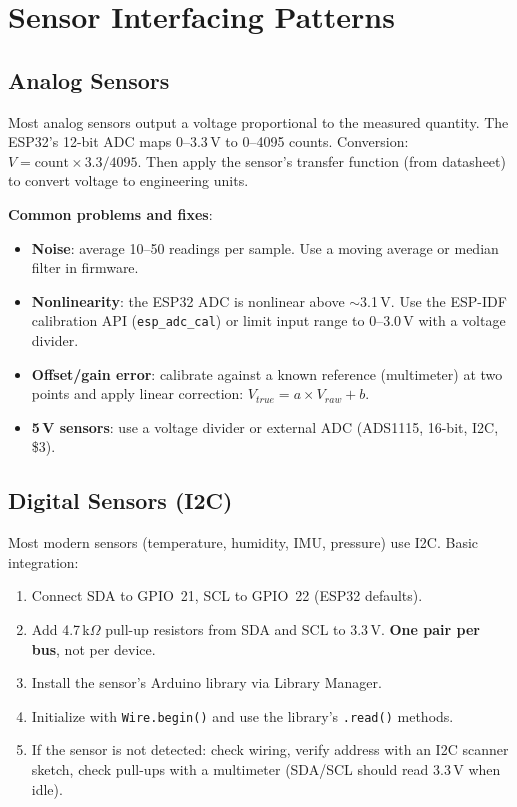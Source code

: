 \documentclass[11pt,letterpaper,twoside,openany]{book}
\begin{document}
\section{Sensor Interfacing Patterns}

\subsection{Analog Sensors}
Most analog sensors output a voltage proportional to the measured quantity. The ESP32's 12-bit ADC maps 0--3.3\,V to 0--4095 counts. Conversion: $V = \text{count} \times 3.3 / 4095$. Then apply the sensor's transfer function (from datasheet) to convert voltage to engineering units.

\textbf{Common problems and fixes}:
\begin{itemize}[nosep,leftmargin=1.5em]
\item \textbf{Noise}: average 10--50 readings per sample. Use a moving average or median filter in firmware.
\item \textbf{Nonlinearity}: the ESP32 ADC is nonlinear above $\sim$3.1\,V. Use the ESP-IDF calibration API (\texttt{esp\_adc\_cal}) or limit input range to 0--3.0\,V with a voltage divider.
\item \textbf{Offset/gain error}: calibrate against a known reference (multimeter) at two points and apply linear correction: $V_{true} = a \times V_{raw} + b$.
\item \textbf{5\,V sensors}: use a voltage divider or external ADC (ADS1115, 16-bit, I2C, \$3).
\end{itemize}

\subsection{Digital Sensors (I2C)}
Most modern sensors (temperature, humidity, IMU, pressure) use I2C. Basic integration:
\begin{enumerate}[nosep,leftmargin=1.5em]
\item Connect SDA to GPIO~21, SCL to GPIO~22 (ESP32 defaults).
\item Add 4.7\,k$\Omega$ pull-up resistors from SDA and SCL to 3.3\,V. \textbf{One pair per bus}, not per device.
\item Install the sensor's Arduino library via Library Manager.
\item Initialize with \texttt{Wire.begin()} and use the library's \texttt{.read()} methods.
\item If the sensor is not detected: check wiring, verify address with an I2C scanner sketch, check pull-ups with a multimeter (SDA/SCL should read 3.3\,V when idle).
\end{enumerate}
\end{document}

